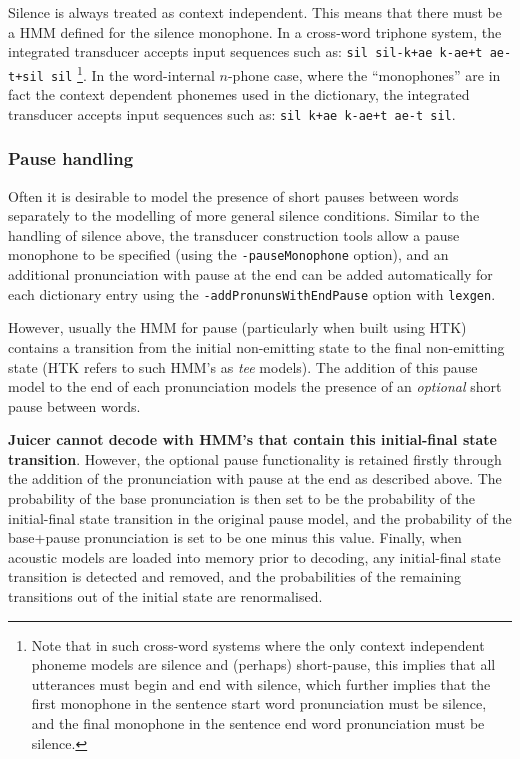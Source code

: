 \documentclass[a4paper,12pt]{report}
\begin{document}
Silence is always treated as context independent. This means that there must be a HMM defined for the silence monophone. In a cross-word triphone system, the integrated transducer accepts input sequences such as: {\tt sil sil-k+ae k-ae+t ae-t+sil sil} \footnote{Note that in such cross-word systems where the only context independent phoneme models are silence and (perhaps) short-pause, this implies that all utterances must begin and end with silence, which further implies that the first monophone in the sentence start word pronunciation must be silence, and the final monophone in the sentence end word pronunciation must be silence.}. In the word-internal $n$-phone case, where the ``monophones'' are in fact the context dependent phonemes used in the dictionary, the integrated transducer accepts input sequences such as: {\tt sil k+ae k-ae+t ae-t sil}.


\subsubsection{Pause handling}

Often it is desirable to model the presence of short pauses between words separately to the modelling of more general silence conditions. Similar to the handling of silence above, the transducer construction tools allow a pause monophone to be specified (using the {\tt -pauseMonophone} option), and an additional pronunciation with pause at the end can be added automatically for each dictionary entry using the {\tt -addPronunsWithEndPause} option with {\tt lexgen}.

However, usually the HMM for pause (particularly when built using HTK) contains a transition from the initial non-emitting state to the final non-emitting state (HTK refers to such HMM's as \emph{tee} models). The addition of this pause model to the end of each pronunciation models the presence of an \emph{optional} short pause between words. 

{\bf Juicer cannot decode with HMM's that contain this initial-final state transition}. However, the optional pause functionality is retained firstly through the addition of the pronunciation with pause at the end as described above. The probability of the base pronunciation is then set to be the probability of the initial-final state transition in the original pause model, and the probability of the base+pause pronunciation is set to be one minus this value. Finally, when acoustic models are loaded into memory prior to decoding, any initial-final state transition is detected and removed, and the probabilities of the remaining transitions out of the initial state are renormalised.
\end{document}
